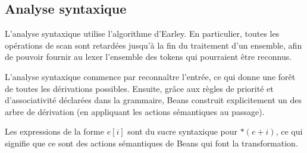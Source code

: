 \documentclass{scrartcl}
\begin{document}
\subsection*{Analyse syntaxique}
L'analyse syntaxique utilise l'algorithme d'Earley. En particulier, toutes les
opérations de scan sont retardées jusqu'à la fin du traitement d'un ensemble,
afin de pouvoir fournir au lexer l'ensemble des tokens qui pourraient être
reconnus.\par
L'analyse syntaxique commence par reconnaître l'entrée, ce qui donne une forêt
de toutes les dérivations possibles. Ensuite, grâce aux règles de priorité et
d'associativité déclarées dans la grammaire, Beans construit explicitement
un des arbre de dérivation (en appliquant les actions sémantiques au passage).\par
Les expressions de la forme \(e[i]\) sont du sucre syntaxique pour \(*(e+i)\),
ce qui signifie que ce sont des actions sémantiques de Beans qui font la
transformation.
\end{document}
